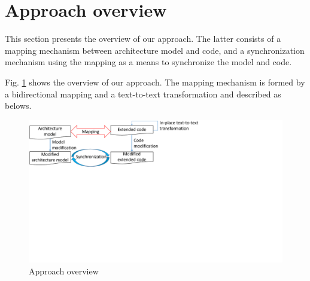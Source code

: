 \section{Approach overview}
\label{sec:approach}
This section presents the overview of our approach.
The latter consists of a mapping mechanism between architecture model and code, and a synchronization mechanism using the mapping as a means to synchronize the model and code.%

Fig. \ref{fig:mappingoverview} shows the overview of our approach.
The mapping mechanism is formed by a bidirectional mapping and a text-to-text transformation and described as belows.



\begin{figure}
	\centering
	\includegraphics[clip, trim=0cm 12.5cm 9.6cm 0cm, width=\columnwidth]{figures/approachoverview.pdf}
	\caption{Approach overview} 
	\label{fig:mappingoverview}
\end{figure}


